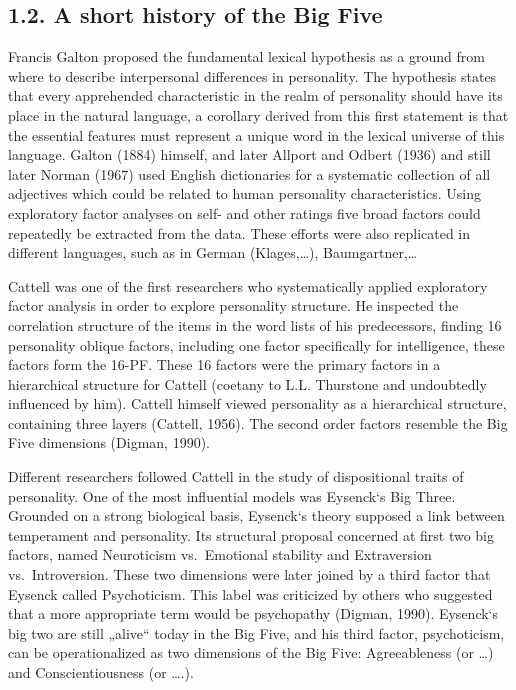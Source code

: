 \documentclass[man]{apa6}
\theoremstyle{definition}
\theoremstyle{definition}
\theoremstyle{definition}
\theoremstyle{remark}
\begin{document}
\hypertarget{a-short-history-of-the-big-five}{%
\subsection{1.2. A short history of the Big
Five}\label{a-short-history-of-the-big-five}}

Francis Galton proposed the fundamental lexical hypothesis as a ground
from where to describe interpersonal differences in personality. The
hypothesis states that every apprehended characteristic in the realm of
personality should have its place in the natural language, a corollary
derived from this first statement is that the essential features must
represent a unique word in the lexical universe of this language. Galton
(1884) himself, and later Allport and Odbert (1936) and still later
Norman (1967) used English dictionaries for a systematic collection of
all adjectives which could be related to human personality
characteristics. Using exploratory factor analyses on self- and other
ratings five broad factors could repeatedly be extracted from the data.
These efforts were also replicated in different languages, such as in
German (Klages,\ldots{}), Baumgartner,\ldots{}

Cattell was one of the first researchers who systematically applied
exploratory factor analysis in order to explore personality structure.
He inspected the correlation structure of the items in the word lists of
his predecessors, finding 16 personality oblique factors, including one
factor specifically for intelligence, these factors form the 16-PF.
These 16 factors were the primary factors in a hierarchical structure
for Cattell (coetany to L.L. Thurstone and undoubtedly influenced by
him). Cattell himself viewed personality as a hierarchical structure,
containing three layers (Cattell, 1956). The second order factors
resemble the Big Five dimensions (Digman, 1990).

Different researchers followed Cattell in the study of dispositional
traits of personality. One of the most influential models was Eysenck`s
Big Three. Grounded on a strong biological basis, Eysenck`s theory
supposed a link between temperament and personality. Its structural
proposal concerned at first two big factors, named Neuroticism
vs.~Emotional stability and Extraversion vs.~Introversion. These two
dimensions were later joined by a third factor that Eysenck called
Psychoticism. This label was criticized by others who suggested that a
more appropriate term would be psychopathy (Digman, 1990). Eysenck`s big
two are still „alive`` today in the Big Five, and his third factor,
psychoticism, can be operationalized as two dimensions of the Big Five:
Agreeableness (or \ldots{}) and Conscientiousness (or \ldots{}.).
\end{document}
